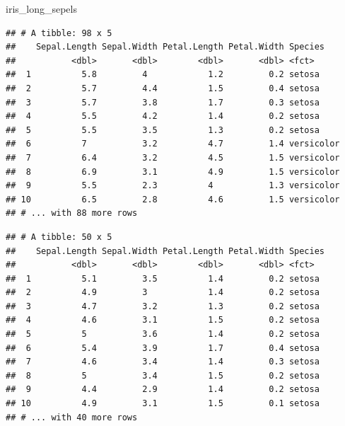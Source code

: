 \documentclass[
]{article}
\newenvironment{Shaded}{\begin{snugshade}}{\end{snugshade}}
\newcommand{\CommentTok}[1]{\textcolor[rgb]{0.56,0.35,0.01}{\textit{#1}}}
\newcommand{\KeywordTok}[1]{\textcolor[rgb]{0.13,0.29,0.53}{\textbf{#1}}}
\newcommand{\NormalTok}[1]{#1}
\newcommand{\OperatorTok}[1]{\textcolor[rgb]{0.81,0.36,0.00}{\textbf{#1}}}
\newcommand{\StringTok}[1]{\textcolor[rgb]{0.31,0.60,0.02}{#1}}
\begin{document}
\begin{Shaded}
\begin{Highlighting}[]
\NormalTok{iris_long_sepels}
\end{Highlighting}
\end{Shaded}

\begin{verbatim}
## # A tibble: 98 x 5
##    Sepal.Length Sepal.Width Petal.Length Petal.Width Species   
##           <dbl>       <dbl>        <dbl>       <dbl> <fct>     
##  1          5.8         4            1.2         0.2 setosa    
##  2          5.7         4.4          1.5         0.4 setosa    
##  3          5.7         3.8          1.7         0.3 setosa    
##  4          5.5         4.2          1.4         0.2 setosa    
##  5          5.5         3.5          1.3         0.2 setosa    
##  6          7           3.2          4.7         1.4 versicolor
##  7          6.4         3.2          4.5         1.5 versicolor
##  8          6.9         3.1          4.9         1.5 versicolor
##  9          5.5         2.3          4           1.3 versicolor
## 10          6.5         2.8          4.6         1.5 versicolor
## # ... with 88 more rows
\end{verbatim}

\begin{Shaded}
\end{Shaded}

\begin{verbatim}
## # A tibble: 50 x 5
##    Sepal.Length Sepal.Width Petal.Length Petal.Width Species
##           <dbl>       <dbl>        <dbl>       <dbl> <fct>  
##  1          5.1         3.5          1.4         0.2 setosa 
##  2          4.9         3            1.4         0.2 setosa 
##  3          4.7         3.2          1.3         0.2 setosa 
##  4          4.6         3.1          1.5         0.2 setosa 
##  5          5           3.6          1.4         0.2 setosa 
##  6          5.4         3.9          1.7         0.4 setosa 
##  7          4.6         3.4          1.4         0.3 setosa 
##  8          5           3.4          1.5         0.2 setosa 
##  9          4.4         2.9          1.4         0.2 setosa 
## 10          4.9         3.1          1.5         0.1 setosa 
## # ... with 40 more rows
\end{verbatim}
\end{document}
